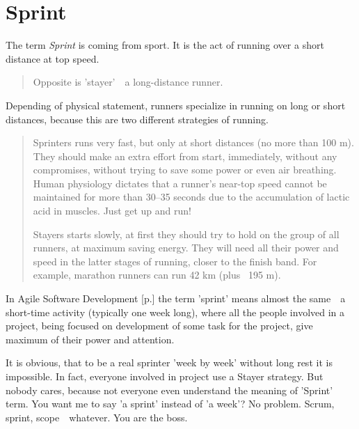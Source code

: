 \section{Sprint}
\label{sec:Sprint}

The term \emph{Sprint} is coming from sport. It is the act of running over a short distance at top speed.

\begin{quote}
Opposite is 'stayer'~\textemdash~a long-distance runner.\end{quote} 

Depending of physical statement, runners specialize in running on long or short distances, because this are two different strategies of running.

\begin{quote}
Sprinters runs very fast, but only at short distances (no more than 100 m). They should make an extra effort from start, immediately, without any compromises, without trying to save some power or even air breathing. Human physiology dictates that a runner's near-top speed cannot be maintained for more than 30–35 seconds due to the accumulation of lactic acid in muscles. Just get up and run!

Stayers starts slowly, at first they should try to hold on the group of all runners, at maximum saving energy. They will need all their power and speed in the latter stages of running, closer to the finish band. For example, marathon runners can run 42 km (plus ~195 m).                                                                                                                                                                                                                                                   \end{quote} 

In Agile Software Development [p.\pageref{sec:Agile Software Development}] the term 'sprint' means almost the same~\textemdash~a short-time activity (typically one week long), where all the people involved in a project, being focused on development of some task for the project, give maximum of their power and attention.

It is obvious, that to be a real sprinter 'week by week' without long rest it is impossible. In fact, everyone involved in project use a Stayer strategy. But nobody cares, because not everyone even understand the meaning of 'Sprint' term. You want me to say 'a sprint' instead of 'a week'? No problem. Scrum, sprint, scope~\textemdash~whatever. You are the boss.
